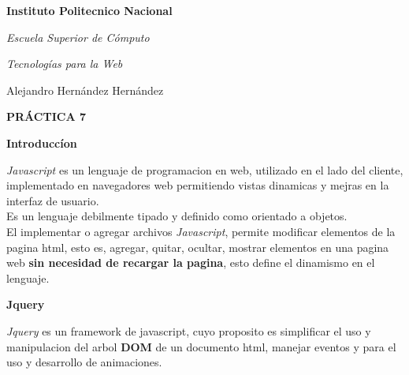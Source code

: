 \documentclass[12pt,letterpaper]{article}
\begin{document}
{\Huge {\rm { \bf Instituto Politecnico Nacional}}}\\
\begin{center}
{\huge {\rm {\em Escuela Superior de C\'omputo}}} \\
\end{center}
\begin{center}
{\Large {\em Tecnolog\'ias para la Web}}\\
\end{center}
\begin{center}
{\Large Alejandro Hern\'andez Hern\'andez}\\
\end{center}
\begin{center}
{\huge {\bf PR\'ACTICA 7}}
\end{center}

\newpage %
{\Huge {\rm {\bf Introducc\'ion}}}

\vspace{3mm}

{\em Javascript} es un lenguaje de programacion en web, utilizado en el lado del cliente, implementado en navegadores web permitiendo vistas dinamicas y mejras en la interfaz de usuario.
\\Es un lenguaje debilmente tipado y definido como orientado a objetos.
\\El implementar o agregar archivos {\em Javascript}, permite modificar elementos de la pagina html, esto es, agregar, quitar, ocultar, mostrar elementos en una pagina web {\bf sin necesidad de recargar la pagina}, esto define el dinamismo en el lenguaje.

\vspace{2mm}

{\bf Jquery}

\vspace{2mm}

{\em Jquery} es un framework de javascript, cuyo proposito es simplificar el uso y manipulacion del arbol {\bf DOM} de un documento html, manejar eventos y para el uso y desarrollo de animaciones.

\begin{flushleft}

\end{flushleft}
\end{document}
